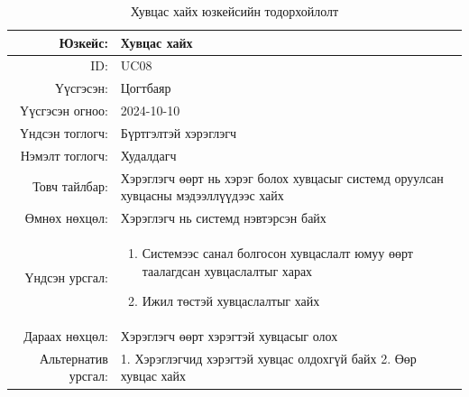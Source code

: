 \begin{longtable}{|r|p{11.5cm}|}
    \caption{Хувцас хайх юзкейсийн тодорхойлолт} 
    \label{table:songolt4}\\ \hline
    {Юзкейс:} & {Хувцас хайх}\\ \hline
    {ID:} & {UC08}\\ \hline
    {Үүсгэсэн:} & {Цогтбаяр}\\ \hline
    {Үүсгэсэн огноо:} & {2024-10-10}\\ \hline
    {Үндсэн тоглогч:} & {Бүртгэлтэй хэрэглэгч}\\ \hline
    {Нэмэлт тоглогч:} & {Худалдагч}\\ \hline
    {Товч тайлбар:} & {Хэрэглэгч өөрт нь хэрэг болох хувцасыг системд оруулсан хувцасны мэдээллүүдээс хайх}\\ \hline
    {Өмнөх нөхцөл:} & {Хэрэглэгч нь системд нэвтэрсэн байх}\\ \hline
    {Үндсэн урсгал:} & {\begin{enumerate}
        \item Системээс санал болгосон хувцаслалт юмуу өөрт таалагдсан хувцаслалтыг харах
    \item Ижил төстэй хувцаслалтыг хайх
    \end{enumerate}}\\ \hline
    {Дараах нөхцөл:} & {Хэрэглэгч өөрт хэрэгтэй хувцасыг олох}\\ \hline
    {Альтернатив урсгал:} & {1. Хэрэглэгчид хэрэгтэй хувцас олдохгүй байх 
    2. Өөр хувцас хайх}\\ \hline
\end{longtable}
\newpage
